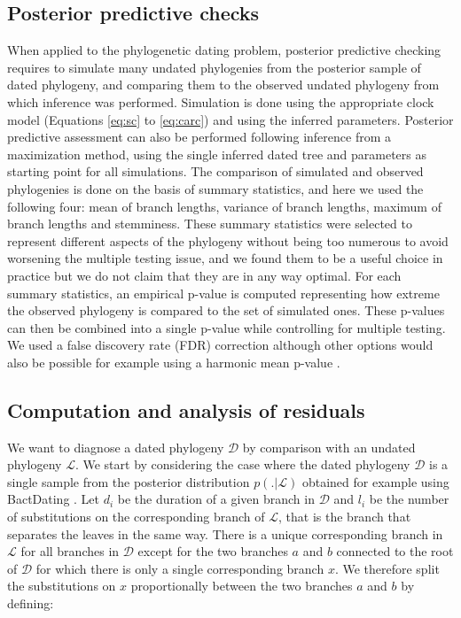 \documentclass{article}
\begin{document}
\subsection*{Posterior predictive checks}

When applied to the phylogenetic dating problem, posterior predictive checking requires
to simulate many undated phylogenies from the posterior sample of dated phylogeny,
and comparing them to the observed undated phylogeny from which inference was performed.
Simulation is done using the appropriate clock model (Equations \ref{eq:sc} to \ref{eq:carc})
and using the inferred parameters. Posterior predictive assessment can also be performed
following inference from a maximization method, using the single inferred dated tree and parameters as 
starting point for all simulations. 
The comparison of simulated and observed phylogenies is done on the basis of summary statistics, and
here we used the following four: mean of branch lengths, variance of branch lengths,
maximum of branch lengths and stemminess. 
These summary statistics were selected to represent different aspects of the phylogeny without
being too numerous to avoid worsening the multiple testing issue, and we found them to be a useful
choice in practice but we do not claim that they are in any way optimal.
For each summary statistics, an empirical p-value is computed representing how extreme the 
observed phylogeny is compared to the set of simulated ones. 
These p-values can then be combined into a single p-value while controlling for multiple testing.
We used a false discovery rate (FDR) correction \citep{Benjamini1995} although other options would also be 
possible for example using a harmonic mean p-value \citep{wilsonHarmonicMeanPvalue2019}.

\subsection*{Computation and analysis of residuals}

We want to diagnose a dated phylogeny $\mathcal{D}$ by comparison with an undated phylogeny $\mathcal{L}$. We start by considering the case where the dated phylogeny $\mathcal{D}$ is a single sample from the posterior distribution $p(.|\mathcal{L})$ obtained for example using BactDating \citep{Didelot2018}.
Let $d_i$ be the duration of a given branch in $\mathcal{D}$ and $l_i$ be the number of substitutions on the corresponding branch of $\mathcal{L}$, that is the branch that separates the leaves in the same way. There is a unique corresponding branch in $\mathcal{L}$ for all branches in $\mathcal{D}$ except for the two branches $a$ and $b$ connected to the root of $\mathcal{D}$ for which there is only a single corresponding branch $x$. We therefore split the substitutions on $x$ proportionally between the two branches $a$ and $b$ by defining:
\end{document}
